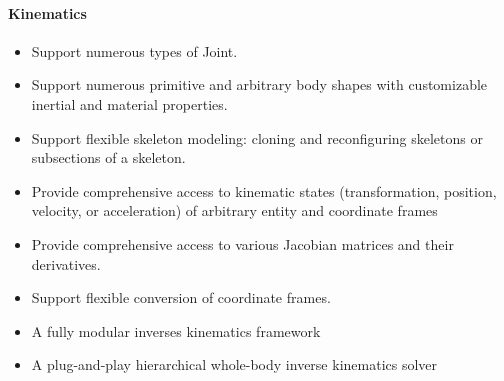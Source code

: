 \paragraph{Kinematics}
\begin{itemize}[leftmargin=*] \itemsep1pt \parskip0pt 
  \item Support numerous types of Joint.
  \item Support numerous primitive and arbitrary body shapes with customizable inertial and material properties.
  \item Support flexible skeleton modeling: cloning and reconfiguring skeletons or subsections of a skeleton.
  \item Provide comprehensive access to kinematic states (\eg transformation, position, velocity, or acceleration) of arbitrary entity and coordinate frames
  \item Provide comprehensive access to various Jacobian matrices and their derivatives.
  \item Support flexible conversion of coordinate frames.
  \item A fully modular inverses kinematics framework
  \item A plug-and-play hierarchical whole-body inverse kinematics solver
\end{itemize}


